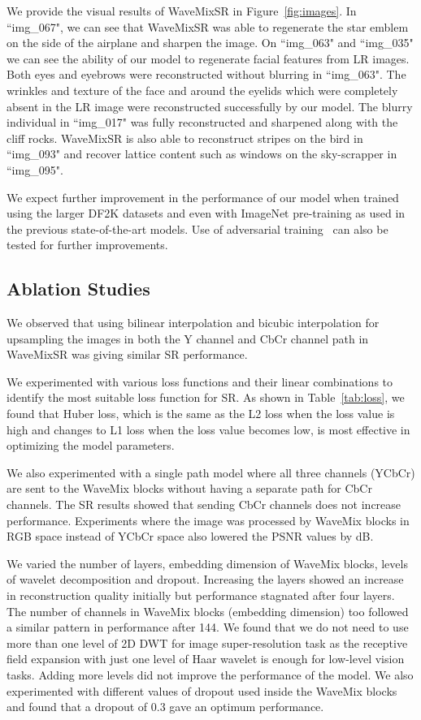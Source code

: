 \documentclass{article}
\begin{document}
We provide the visual results of WaveMixSR in Figure~\ref{fig:images}. In ``img\_067", we can see that WaveMixSR was able to regenerate the star emblem on the side of the airplane and sharpen the image. On ``img\_063" and ``img\_035" we can see the ability of our model to regenerate facial features from LR images. Both eyes and eyebrows were reconstructed without blurring in ``img\_063". The wrinkles and texture of the face and  around the eyelids which were completely absent in the LR image were reconstructed successfully by our model. The blurry individual in ``img\_017" was fully reconstructed and sharpened along with the cliff rocks. WaveMixSR is also able to reconstruct stripes on the bird in ``img\_093" and recover lattice content such as windows on the sky-scrapper in ``img\_095".

We expect further improvement in the performance of our model when trained using the larger DF2K datasets and even with ImageNet pre-training as used in the previous state-of-the-art models. Use of adversarial training~\cite{ledig2017photorealistic} can also be tested for further improvements.


\subsection{Ablation Studies}

We observed that using bilinear interpolation and bicubic interpolation for upsampling the images in both the Y channel and CbCr channel path in WaveMixSR was giving similar SR performance. 

We experimented with various loss functions and their linear combinations to identify the most suitable loss function for SR. As shown in Table~\ref{tab:loss}, we found that Huber loss, which is the same as the L2 loss when the loss value is high and changes to L1 loss when the loss value becomes low, is most effective in optimizing  the model parameters. 



We also experimented with a single path model where all three channels (YCbCr) are sent to the WaveMix blocks without having a separate path for CbCr channels. The SR results showed that sending CbCr channels does not increase performance. Experiments where the image was processed by WaveMix blocks in RGB space instead of YCbCr space also lowered the PSNR values by dB. 

We varied the number of layers, embedding dimension of WaveMix blocks, levels of wavelet decomposition and dropout. Increasing the layers showed an increase in reconstruction quality initially but performance stagnated after four layers. The number of channels in WaveMix blocks (embedding dimension) too followed a similar pattern in performance after 144. We found that we do not need to use more than one level of 2D DWT for image super-resolution task as the receptive field expansion with just one level of Haar wavelet is enough for low-level vision tasks. Adding more levels did not improve the performance of the model. We also experimented with different values of dropout used inside the WaveMix blocks and found that a dropout of 0.3 gave an optimum performance.
\end{document}
